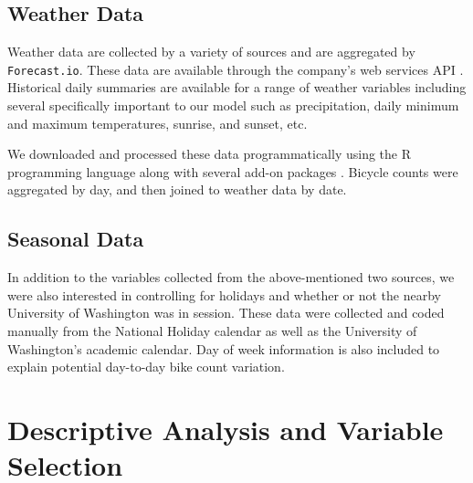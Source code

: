 \documentclass [11pt, proquest] {uwthesis}[2015/03/03]
\begin{document}
\subsection{Weather Data}
Weather data are collected by a variety of sources and are aggregated by \texttt{Forecast.io}. These data are available through the company's web services API \cite{The-Dark-Sky-Company:aa}. Historical daily summaries are available for a range of weather variables including several specifically important to our model such as precipitation, daily minimum and maximum temperatures, sunrise, and sunset, etc.

We downloaded and processed these data programmatically using the R programming language along with several add-on packages \cite{Grolemund:2011aa,Wickham:2011aa,Couture-Beil:2014aa,Lang:2014aa,R-Core-Team:2014aa}. Bicycle counts were aggregated by day, and then joined to weather data by date. 

\subsection{Seasonal Data}
In addition to the variables collected from the above-mentioned two sources, we were also interested in controlling for holidays and whether or not the nearby University of Washington was in session. These data were collected and coded manually from the National Holiday calendar as well as the University of Washington's academic calendar. Day of week information is also included to explain potential day-to-day bike count variation. 

\section{Descriptive Analysis and Variable Selection}
\label{sec:eda}

\end{document}
